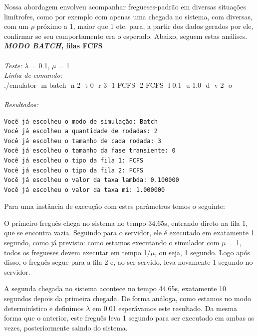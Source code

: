 \documentclass[a4paper,10pt]{article}
\begin{document}
    Nossa abordagem envolveu acompanhar fregueses-padrão em diversas situações limítrofes, como por exemplo com apenas uma chegada no sistema, com diversas, com um $\rho$ próximo a 1, maior que 1 etc. para, a partir dos dados gerados por ele, confirmar se seu comportamento era o esperado. Abaixo, seguem estas análises.
\\
\textbf{\emph{MODO BATCH}, filas FCFS}
\\
\\
\emph{Teste:} $\lambda$ = 0.1, $\mu$ = 1
\\
\emph{Linha de comando:}
\\
./cmulator -m batch -n 2 -t 0 -r 3 -1 FCFS -2 FCFS -l 0.1 -u 1.0 -d -v 2 -o
\\
\\
\emph{Resultados:}
\\
\begin{verbatim}
Você já escolheu o modo de simulação: Batch
Você já escolheu a quantidade de rodadas: 2
Você já escolheu o tamanho de cada rodada: 3
Você já escolheu o tamanho da fase transiente: 0
Você já escolheu o tipo da fila 1: FCFS
Você já escolheu o tipo da fila 2: FCFS
Você já escolheu o valor da taxa lambda: 0.100000
Você já escolheu o valor da taxa mi: 1.000000

\end{verbatim}
Para uma instância de execução com estes parâmetros temos o seguinte:

O primeiro freguês chega no sistema no tempo 34.65s, entrando direto na fila 1, que se encontra vazia. Seguindo para o servidor, ele é executado em exatamente 1 segundo, como já previsto: como estamos executando o simulador com $\mu$ = 1, todos os fregueses devem executar em tempo 1/$\mu$, ou seja, 1 segundo. Logo após disso, o freguês segue para a fila 2 e, ao ser servido, leva novamente 1 segundo no servidor.

A segunda chegada no sistema acontece no tempo 44.65s, exatamente 10 segundos depois da primeira chegada. De forma análoga, como estamos no modo determinístico e definimos $\lambda$ em 0.01 esperávamos este resultado. Da mesma forma que o anterior, este freguês leva 1 segundo para ser executado em ambas as vezes, posteriormente saindo do sistema.
\end{document}
